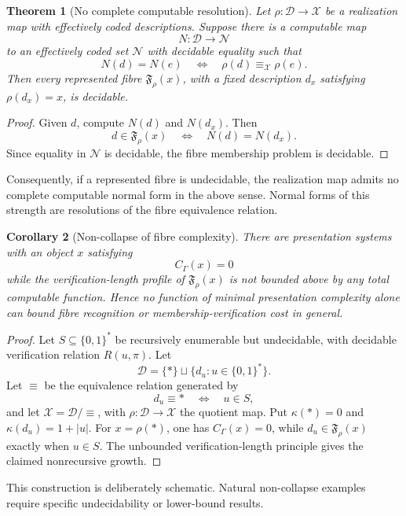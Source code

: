 \documentclass[11pt]{article}
\newtheorem{theorem}{Theorem}[section]
\newtheorem{corollary}[theorem]{Corollary}
\begin{document}
\begin{theorem}[No complete computable resolution]
Let \(\rho:\mathcal D\to\mathcal X\) be a realization map with effectively coded descriptions. Suppose there is a computable map
\[
N:\mathcal D\to\mathcal N
\]
to an effectively coded set \(\mathcal N\) with decidable equality
such that
\[
N(d)=N(e)
\quad\Longleftrightarrow\quad
\rho(d)\equiv_\mathcal X\rho(e).
\]
Then every represented fibre \(\mathfrak F_\rho(x)\), with a fixed description \(d_x\) satisfying \(\rho(d_x)=x\), is decidable.
\end{theorem}

\begin{proof}
Given \(d\), compute \(N(d)\) and \(N(d_x)\). Then
\[
d\in\mathfrak F_\rho(x)
\quad\Longleftrightarrow\quad
N(d)=N(d_x).
\]
Since equality in \(\mathcal N\) is decidable, the fibre membership problem is decidable.
\end{proof}

Consequently, if a represented fibre is undecidable, the realization map admits no complete computable normal form in the above sense. Normal forms of this strength are resolutions of the fibre equivalence relation.

\begin{corollary}[Non-collapse of fibre complexity]
There are presentation systems with an object \(x\) satisfying
\[
C_\Gamma(x)=0
\]
while the verification-length profile of \(\mathfrak F_\rho(x)\) is not bounded above by any total computable function. Hence no function of minimal presentation complexity alone can bound fibre recognition or membership-verification cost in general.
\end{corollary}

\begin{proof}
Let \(S\subseteq\{0,1\}^*\) be recursively enumerable but undecidable, with decidable verification relation \(R(u,\pi)\). Let
\[
\mathcal D=\{\ast\}\sqcup\{d_u:u\in\{0,1\}^*\}.
\]
Let \(\equiv\) be the equivalence relation generated by
\[
d_u\equiv\ast
\quad\Longleftrightarrow\quad
u\in S,
\]
and let \(\mathcal X=\mathcal D/\!\equiv\), with \(\rho:\mathcal D\to\mathcal X\) the quotient map. Put \(\kappa(\ast)=0\) and \(\kappa(d_u)=1+|u|\). For \(x=\rho(\ast)\), one has \(C_\Gamma(x)=0\), while \(d_u\in\mathfrak F_\rho(x)\) exactly when \(u\in S\). The unbounded verification-length principle gives the claimed nonrecursive growth.
\end{proof}

This construction is deliberately schematic. Natural non-collapse examples require specific undecidability or lower-bound results.
\end{document}
